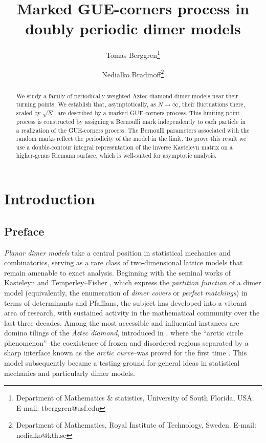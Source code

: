 \documentclass[11pt]{article}
\title{Marked GUE-corners process in doubly periodic dimer models}
\author{Tomas Berggren\footnote{Department of Mathematics \& statistics, University of South Florida, USA. E-mail: tberggren@usf.edu} 
\and Nedialko Bradinoff\footnote{Department of Mathematics, Royal Institute of Technology, Sweden. E-mail: nedialko@kth.se}
}
\theoremstyle{plain}
\theoremstyle{definition}
\numberwithin{equation}{section}
\begin{document}
\date{}

\maketitle

\begin{abstract}
We study a family of periodically weighted Aztec diamond dimer models near their turning points. We establish that, asymptotically, as $N\rightarrow\infty$, their fluctuations there, scaled by $\sqrt{N}$, are described by a marked GUE-corners process. This limiting point process is constructed by assigning a Bernoulli mark independently to each particle in a realization of the GUE-corners process. The Bernoulli parameters associated with the random marks reflect the periodicity of the model in the limit. To prove this result we use a double-contour integral representation of the inverse Kasteleyn matrix on a higher-genus Riemann surface, which is well-suited for asymptotic analysis. 
\end{abstract}


\tableofcontents

\section{Introduction}

\subsection{Preface}

\textit{Planar dimer models} take a central position in statistical mechanics and combinatorics, serving as a rare class of two-dimensional lattice models that remain amenable to exact analysis. Beginning with the seminal works of Kasteleyn \cite{Kas61} and Temperley–Fisher \cite{TF61}, which express the \emph{partition function} of a dimer model (equivalently, the enumeration of \textit{dimer covers} or \textit{perfect matchings}) in terms of determinants and Pfaffians, the subject has developed into a vibrant area of research, with sustained activity in the mathematical community over the last three decades.
Among the most accessible and influential instances are domino tilings of the \textit{Aztec diamond}, introduced in \cite{EKLP92a, EKLP92b}, where the ``arctic circle phenomenon''--the coexistence of frozen and disordered regions separated by a sharp interface known as the \textit{arctic curve}--was proved for the first time \cite{JPS98}. This model subsequently became a testing ground for general ideas in statistical mechanics and particularly dimer models.
\end{document}
